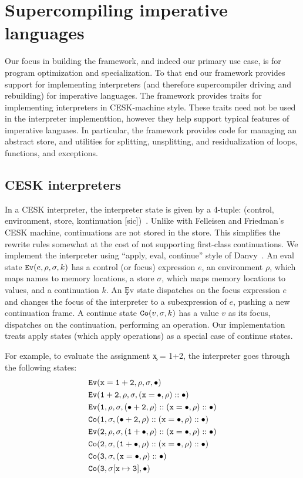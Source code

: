 \section{Supercompiling imperative languages}

Our focus in building the framework, and indeed our primary use case,
is for program optimization and specialization.
To that end our framework provides support for 
implementing interpreters (and therefore supercompiler
driving and rebuilding) for imperative languages.
The framework provides traits for implementing interpreters
in CESK-machine style. 
These traits need not be used in the interpreter implementtion,
however they help support
typical features of imperative languaes.
In particular, the framework provides code for managing an abstract store,
and utilities for 
splitting, unsplitting, and
residualization of loops, functions, and exceptions.

\subsection{CESK interpreters}

In a CESK interpreter, the interpreter state is given by a 4-tuple:
(control, environment, store, kontinuation [sic])~\cite{cesk}.
Unlike with Felleisen and Friedman's CESK machine, continuations
are not stored in the store. This simplifies the rewrite rules
somewhat at the cost of not supporting
first-class continuations. 
We implement the interpreter using
``apply, eval, continue'' style of Danvy~\cite{danvy}.
An eval state $\c{Ev}(e, \rho, \sigma, k)$
has a control (or focus) expression $e$, an environment $\rho$,
which maps names to memory locations, a store $\sigma$, which maps
memory locations to values, and a continuation $k$.
An \c{Ev} state
dispatches on the focus expression $e$ and
changes the focus of the interpreter to a subexpression of $e$, pushing a new continuation frame.
A continue state $\c{Co}(v, \sigma, k)$
has a value $v$ as its focus, dispatches on the continuation, performing an
operation. 
Our implementation treats apply states (which apply operations)
as a special case of continue states.

For example, to evaluate the assignment \c{x = 1+2}, the interpreter goes through the following
states:
\begin{align*}
& \c{Ev}(\c{x = 1+2}, \rho, \sigma, \bullet) \\ 
& \c{Ev}(\c{1+2}, \rho, \sigma, (\c{x = \bullet},\rho)::\bullet) \\
& \c{Ev}(\c{1}, \rho, \sigma, (\c{\bullet+2},\rho)::(\c{x = \bullet},\rho)::\bullet) \\
& \c{Co}(\c{1}, \sigma, (\c{\bullet+2},\rho)::(\c{x = \bullet},\rho)::\bullet) \\
& \c{Ev}(\c{2}, \rho, \sigma, (\c{1+\bullet},\rho)::(\c{x = \bullet},\rho)::\bullet) \\
& \c{Co}(\c{2}, \sigma, (\c{1+\bullet},\rho)::(\c{x = \bullet},\rho)::\bullet) \\
& \c{Co}(\c{3}, \sigma, (\c{x = \bullet},\rho)::\bullet) \\
& \c{Co}(\c{3}, \sigma[\c{x}\mapsto\c{3}], \bullet)
\end{align*}

